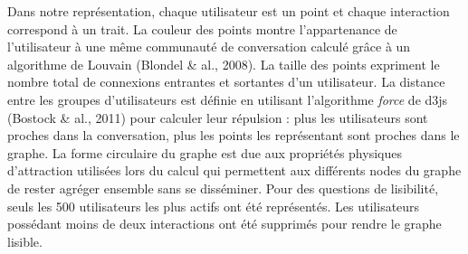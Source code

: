 Dans notre repr\'esentation, chaque utilisateur est un point et chaque
interaction correspond \`a un trait. La couleur des points montre
l{\textquoteright}appartenance de l{\textquoteright}utilisateur \`a une
m\^eme communaut\'e de conversation calcul\'e gr\^ace \`a un algorithme
de Louvain (Blondel \& al., 2008). La taille des points expriment le
nombre total de connexions entrantes et sortantes d{\textquoteright}un
utilisateur. La distance entre les groupes
d{\textquoteright}utilisateurs est d\'efinie en utilisant
l{\textquoteright}algorithme \textit{force }de d3js (Bostock \& al.,
2011) pour calculer leur r\'epulsion : plus les utilisateurs sont
proches dans la conversation, plus les points les repr\'esentant sont
proches dans le graphe. La forme circulaire du graphe est due aux
propri\'et\'es physiques d{\textquoteright}attraction utilis\'ees lors
du calcul qui permettent aux diff\'erents nodes du graphe de rester
agr\'eger ensemble sans se diss\'eminer. Pour des questions de
lisibilit\'e, seuls les 500 utilisateurs les plus actifs ont \'et\'e
repr\'esent\'es. Les utilisateurs poss\'edant moins de deux
interactions ont \'et\'e supprim\'es pour rendre le graphe lisible.

